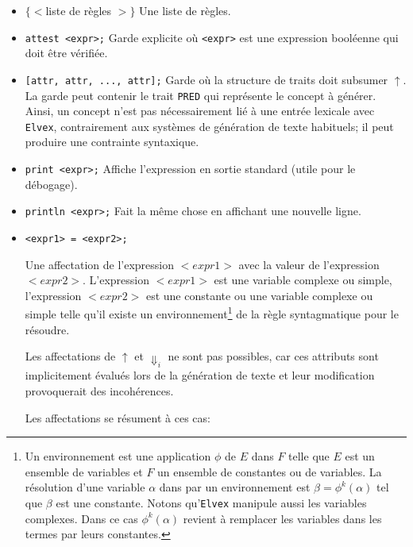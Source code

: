 \documentclass[11pt]{article}
\begin{document}
\begin{itemize}

\item $\{<$liste de règles $>\}$ Une liste de règles.

\item \verb#attest <expr>;# Garde explicite où \verb#<expr># est une
  expression booléenne qui doit être vérifiée.

\item \verb#[attr, attr, ..., attr];# Garde où la structure de traits
  doit subsumer $\uparrow$. La garde peut contenir le trait
  \verb#PRED# qui représente le concept à générer. Ainsi, un concept
  n'est pas nécessairement lié à une entrée lexicale avec
  \texttt{Elvex}, contrairement aux systèmes de génération de texte
  habituels; il peut produire une contrainte syntaxique.

\item \verb#print <expr>;# Affiche l'expression en sortie standard
  (utile pour le débogage).

\item \verb#println <expr>;# Fait la même chose en affichant une
  nouvelle ligne.
  
\item  \verb#<expr1> = <expr2>;#
  
  Une affectation de l'expression $<expr1>$ avec la valeur de
  l'expression $<expr2>$. L'expression $<expr1>$ est une variable
  complexe ou simple, l'expression $<expr2>$ est une constante ou une
  variable complexe ou simple telle qu'il existe un
  environnement\footnote{Un environnement est une application $\phi$
    de $E$ dans $F$ telle que $E$ est un ensemble de variables et $F$
    un ensemble de constantes ou de variables. La résolution d'une
    variable $\alpha$ dans par un environnement est
    $\beta = \phi^k(\alpha)$ tel que $\beta$ est une constante. Notons
    qu'\texttt{Elvex} manipule aussi les variables complexes. Dans ce cas
    $\phi^k(\alpha)$ revient à remplacer les variables dans les
    termes par leurs constantes.} de la règle syntagmatique pour le
  résoudre.
  
  Les affectations de $\uparrow$ et $\Downarrow_i$ ne sont pas
  possibles, car ces attributs sont implicitement évalués lors de la
  génération de texte et leur modification provoquerait des
  incohérences.

Les affectations se résument à ces cas:

  \begin{itemize}
    

\end{itemize}
\end{itemize}
\end{document}
